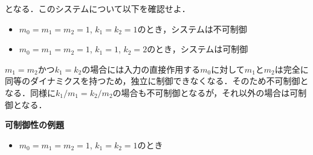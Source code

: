 \documentclass[a4paper,11pt]{jreport}
\begin{document}
となる．このシステムについて以下を確認せよ．
\begin{itemize}
\item $m_0=m_1=m_2=1$, $k_1=k_2=1$のとき，システムは不可制御
\item $m_0=m_1=m_2=1$, $k_1=1$, $k_2=2$のとき，システムは可制御
\end{itemize}
$m_1=m_2$かつ$k_1=k_2$の場合には入力の直接作用する$m_0$に対して$m_1$と$m_2$は完全に同等のダイナミクスを持つため，独立に制御できなくなる．そのため不可制御となる．同様に$k_1/m_1 = k_2/m_2$の場合も不可制御となるが，それ以外の場合は可制御となる．

\newpage

\noindent
{\bf 可制御性の例題}
\begin{itemize}
\item $m_0=m_1=m_2=1$, $k_1=k_2=1$のとき
\end{itemize}
\end{document}
